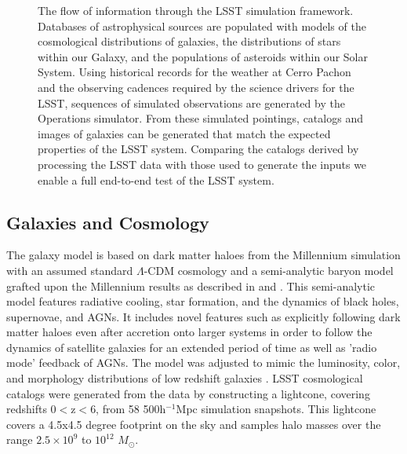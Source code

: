 \documentclass[]{article}
\begin{document}
{\begin{figure}[H]
%
%
\caption{The flow of information through the LSST simulation
  framework. Databases of astrophysical sources are populated with
  models of the cosmological distributions of galaxies, the
  distributions of stars within our Galaxy, and the populations of
  asteroids within our Solar System. Using historical records for the
  weather at Cerro Pachon and the observing cadences required by the
  science drivers for the LSST, sequences of simulated observations
  are generated by the Operations simulator. From these simulated
  pointings, catalogs and images of galaxies can be generated that
  match the expected properties of the LSST system. Comparing the
  catalogs derived by processing the LSST data with those used to
  generate the inputs we enable a full end-to-end test of the LSST
  system.}
\label{fig:flow}       %
\end{figure}


\subsection{Galaxies and Cosmology \label{sec:gal}}

The galaxy model is based on dark matter haloes from the Millennium
simulation \citep{springel05} with an assumed standard $\Lambda$-CDM
cosmology and a semi-analytic baryon model grafted upon the Millennium
results as described in \citet{springel05} and \citet{delucia}. This
semi-analytic model features radiative cooling, star formation, and
the dynamics of black holes, supernovae, and AGNs. It includes
novel features such as explicitly following dark matter haloes even
after accretion onto larger systems in order to follow the dynamics of
satellite galaxies for an extended period of time as well as 'radio
mode' feedback of AGNs. The model was adjusted to mimic the
luminosity, color, and morphology distributions of low redshift
galaxies \citep{delucia}. LSST cosmological catalogs were generated
from the \citet{delucia} data
by constructing a lightcone, covering redshifts 0$<$z$<$6, from 58
500h$^{-1}$Mpc simulation snapshots. This lightcone covers a 4.5x4.5
degree footprint on the sky and samples halo masses over the range
$2.5\times10^9$ to $10^{12}$ $M_\odot$. 

}
\end{document}

